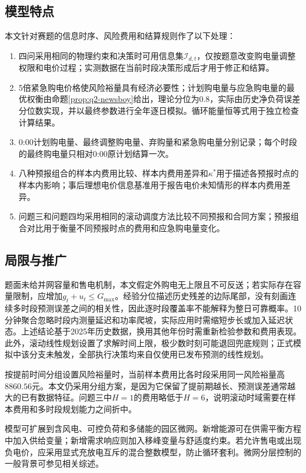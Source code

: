 \documentclass[UTF8,12pt,a4paper]{ctexart}
\theoremstyle{remark}
\begin{document}
\subsection{模型特点}
本文针对赛题的信息时序、风险费用和结算规则作了以下处理：
\begin{enumerate}
\item 四问采用相同的物理约束和决策时可用信息集$\mathcal I_{d,t}$，仅按题意改变购电量调整权限和电价过程；实测数据在当前时段决策形成后才用于修正和结算。
\item 5倍紧急购电价格使风险裕量具有经济必要性；计划购电量与应急购电量的最优权衡由命题\ref{prop:q2-newsboy}给出，理论分位为$0.8$，实际由历史净负荷误差分位数实现，并以最终参数进行全年逐日模拟。循环能量恒等式用于独立检查计算结果。
\item 0:00计划购电量、最终调整购电量、弃购量和紧急购电量分别记录；每个时段的最终购电量只相对0:00原计划结算一次。
\item 八种预报组合的样本内费用比较、样本内费用差异和$\kappa^*$用于描述各预报时点的样本内影响；事后理想电价信息基准用于报告电价未知情形的样本内费用差异。
\item 问题三和问题四均采用相同的滚动调度方法比较不同预报和合同方案；预报组合对比用于衡量不同预报时点的费用和应急购电量变化。
\end{enumerate}
\subsection{局限与推广}
题面未给并网容量和售电机制，本文假定外购电无上限且不可反送；若实际存在容量限制，应增加$g_t+u_t\le G_{\max}$。经验分位描述历史残差的边际尾部，没有刻画连续多时段预测误差之间的相关性，因此逐时段覆盖率不能解释为整日可靠概率。10分钟聚合忽略时段内测量延迟和功率爬坡，实际应用时需缩短步长或加入延迟状态。上述结论基于2025年历史数据，换用其他年份时需重新检验参数和费用表现。此外，滚动线性规划设置了求解时间上限，极少数时刻可能退回兜底规则；正式模拟中该分支未触发，全部执行决策均来自仅使用已发布预测的线性规划。

按提前时间分组设置风险裕量时，当前样本费用比各时段采用同一风险裕量高$8860.56$元。本文仍采用分组方案，是因为它保留了提前期越长、预测误差通常越大的已有数据特征。问题三中$H=1$的费用略低于$H=6$，说明滚动时域需要在样本费用和多时段规划能力之间折中。

模型可扩展到含风电、可控负荷和多储能的园区微网。新增能源可在供需平衡方程中加入供给变量；新增需求响应则加入移峰变量与舒适度约束。若允许售电或出现负电价，应采用显式充放电互斥的混合整数模型，防止循环套利。微网分层控制的一般背景可参见相关综述\cite{bouzid2015microgrid}。
\end{document}
